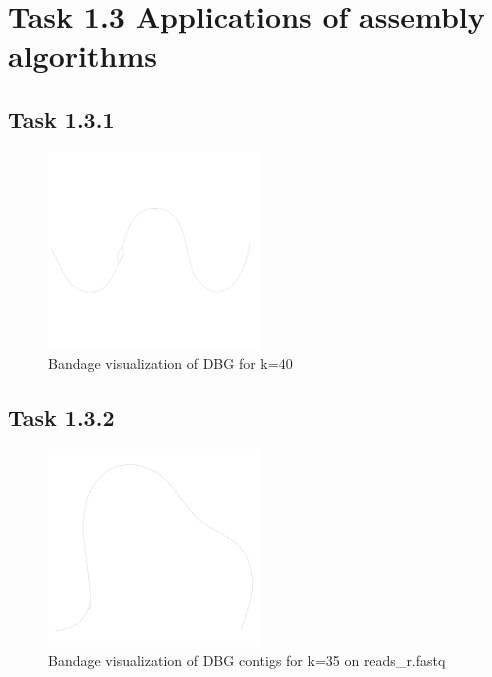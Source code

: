 \documentclass[12pt]{article}
\begin{document}
\section{Task 1.3 Applications of assembly algorithms}

\subsection{Task 1.3.1}

\begin{figure}[h]
    \centering
    \includegraphics[width=0.5\textwidth]{../toy_dataset/reads_b_k_40.png}
    \caption{Bandage visualization of DBG for k=40}
\end{figure} 

\subsection{Task 1.3.2}

\begin{figure}[h]
    \centering
    \includegraphics[width=0.5\textwidth]{../toy_dataset/r-k-35.png}
    \caption{Bandage visualization of DBG contigs for k=35 on reads\_r.fastq}
\end{figure} 
\end{document}
